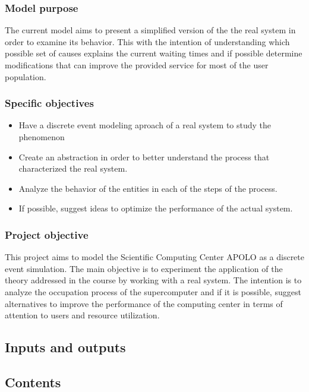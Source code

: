 \documentclass{wscpaperproc}
\begin{document}
\subsubsection{Model purpose}

The current model aims to present a simplified version of the the real system
in order to examine its behavior. This with the intention of understanding which
possible set of causes explains the current waiting times and  if possible determine
modifications that can improve the provided service for most of the user population.

\subsubsection{Specific objectives}

\begin{itemize}
    \item Have a discrete event modeling aproach of a real system to study the phenomenon
    \item Create an abstraction in order to better understand
          the process that characterized the real system.
    \item Analyze the behavior of the entities in each of the steps of the process.
    \item If possible, suggest ideas to optimize the performance of the actual system.
\end{itemize}

\subsubsection{Project objective}

This project aims to model the Scientific Computing Center APOLO as a
discrete event simulation. The main objective is to experiment the
application of the theory addressed in the course by working with a real
system. The intention is to analyze the occupation process of the
supercomputer and if it is possible, suggest alternatives to improve
the performance of the computing center in terms of attention to users
and resource utilization.

\subsection{Inputs and outputs}

\subsection{Contents}
\end{document}
